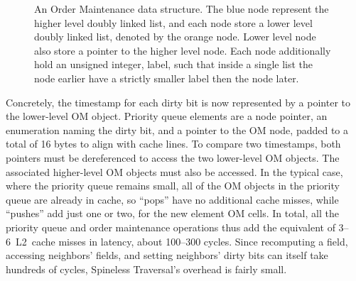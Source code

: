 \begin{figure}
\caption{An Order Maintenance data structure. The blue node represent the higher level doubly linked list, and each node store a lower level doubly linked list, denoted by the orange node. Lower level node also store a pointer to the higher level node. Each node additionally hold an unsigned integer, label, such that inside a single list the node earlier have a strictly smaller label then the node later.}
\label{fig:om}
\end{figure}

Concretely, the timestamp for each dirty bit
  is now represented by a pointer to the lower-level OM object.
Priority queue elements are a node pointer,
  an enumeration naming the dirty bit,
  and a pointer to the OM node,
  padded to a total of 16 bytes to align with cache lines.
To compare two timestamps, both pointers must be dereferenced
  to access the two lower-level OM objects.
The associated higher-level OM objects must also be accessed.
In the typical case, where the priority queue remains small,
  all of the OM objects in the priority queue
  are already in cache,
  so ``pops'' have no additional cache misses,
  while ``pushes'' add just one or two, for the new element OM cells.
In total, all the priority queue and order maintenance operations
  thus add the equivalent of 3--6~L2~cache misses in latency,
  about 100--300 cycles.
Since recomputing a field, accessing neighbors' fields,
  and setting neighbors' dirty bits can itself take hundreds of cycles,
  Spineless Traversal's overhead is fairly small.

